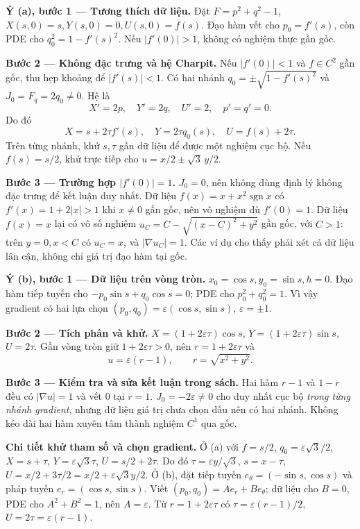\textbf{Ý (a), bước 1 — Tương thích dữ liệu.} Đặt $F=p^2+q^2-1$, $X(s,0)=s,Y(s,0)=0,U(s,0)=f(s)$. Đạo hàm vết cho $p_0=f'(s)$, còn PDE cho $q_0^2=1-f'(s)^2$. Nếu $|f'(0)|>1$, không có nghiệm thực gần gốc.

\textbf{Bước 2 — Không đặc trưng và hệ Charpit.} Nếu $|f'(0)|<1$ và $f\in C^2$ gần gốc, thu hẹp khoảng để $|f'(s)|<1$. Có hai nhánh $q_0=\pm\sqrt{1-f'(s)^2}$ và $J_0=F_q=2q_0\ne0$. Hệ là
\[X'=2p,\quad Y'=2q,\quad U'=2,\quad p'=q'=0.\]
Do đó
\[X=s+2\tau f'(s),\quad Y=2\tau q_0(s),\quad U=f(s)+2\tau.\]
Trên từng nhánh, khử $s,\tau$ gần dữ liệu để được một nghiệm cục bộ. Nếu $f(s)=s/2$, khử trực tiếp cho $u=x/2\pm\sqrt3\,y/2$.

\textbf{Bước 3 — Trường hợp $|f'(0)|=1$.} $J_0=0$, nên không dùng định lý không đặc trưng để kết luận duy nhất. Dữ liệu $f(x)=x+x^2\operatorname{sgn}x$ có $f'(x)=1+2|x|>1$ khi $x\ne0$ gần gốc, nên vô nghiệm dù $f'(0)=1$. Dữ liệu $f(x)=x$ lại có vô số nghiệm $u_C=C-\sqrt{(x-C)^2+y^2}$ gần gốc, với $C>1$: trên $y=0,x<C$ có $u_C=x$, và $|\nabla u_C|=1$. Các ví dụ cho thấy phải xét cả dữ liệu lân cận, không chỉ giá trị đạo hàm tại gốc.

\textbf{Ý (b), bước 1 — Dữ liệu trên vòng tròn.} $x_0=\cos s,y_0=\sin s,h=0$. Đạo hàm tiếp tuyến cho $-p_0\sin s+q_0\cos s=0$; PDE cho $p_0^2+q_0^2=1$. Vì vậy gradient có hai lựa chọn $(p_0,q_0)=\varepsilon(\cos s,\sin s)$, $\varepsilon=\pm1$.

\textbf{Bước 2 — Tích phân và khử.} $X=(1+2\varepsilon\tau)\cos s$, $Y=(1+2\varepsilon\tau)\sin s$, $U=2\tau$. Gần vòng tròn giữ $1+2\varepsilon\tau>0$, nên $r=1+2\varepsilon\tau$ và
\[u=\varepsilon(r-1),\qquad r=\sqrt{x^2+y^2}.\]

\textbf{Bước 3 — Kiểm tra và sửa kết luận trong sách.} Hai hàm $r-1$ và $1-r$ đều có $|\nabla u|=1$ và vết 0 tại $r=1$. $J_0=-2\varepsilon\ne0$ cho duy nhất cục bộ \emph{trong từng nhánh gradient}, nhưng dữ liệu giá trị chưa chọn dấu nên có hai nhánh. Không kéo dài hai hàm xuyên tâm thành nghiệm $C^1$ qua gốc.

\textbf{Chi tiết khử tham số và chọn gradient.} Ở (a) với $f=s/2$, $q_0=\varepsilon\sqrt3/2$, $X=s+\tau$, $Y=\varepsilon\sqrt3\tau$, $U=s/2+2\tau$. Do đó $\tau=\varepsilon y/\sqrt3$, $s=x-\tau$, $U=x/2+3\tau/2=x/2+\varepsilon\sqrt3 y/2$. Ở (b), đặt tiếp tuyến $e_\theta=(-\sin s,\cos s)$ và pháp tuyến $e_r=(\cos s,\sin s)$. Viết $(p_0,q_0)=Ae_r+Be_\theta$; dữ liệu cho $B=0$, PDE cho $A^2+B^2=1$, nên $A=\varepsilon$. Từ $r=1+2\varepsilon\tau$ có $\tau=\varepsilon(r-1)/2$, $U=2\tau=\varepsilon(r-1)$.

